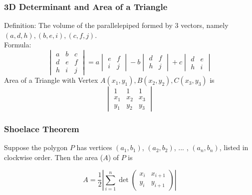 \documentclass{article}
\begin{document}
\subsubsection{3D Determinant and Area of a Triangle}
Definition:
The volume of the parallelepiped formed by 3 vectors, namely $(a,d,h), (b,e,i), (c,f,j)$.\\
Formula:
$$
\begin{vmatrix}
    a & b & c\\
    d & e & f\\
    h & i & j
\end{vmatrix}
=a
\begin{vmatrix}
   e  & f\\
   i  & j
\end{vmatrix}
-b
\begin{vmatrix}
   d  & f\\
   h  & j
\end{vmatrix}
+c
\begin{vmatrix}
   d  & e\\
   h  & i
\end{vmatrix}
$$
Area of a Triangle with Vertex $A(x_1,y_1), B(x_2,y_2), C(x_3,y_3)$ is 
$$
\begin{vmatrix}
    1 & 1 & 1\\
    x_1 & x_2 & x_3\\
    y_1 & y_2 & y_3
\end{vmatrix}
$$
\subsubsection{Shoelace Theorem}

Suppose the polygon $P$ has vertices $(a_1, b_1)$, $(a_2, b_2)$, ... , $(a_n, b_n)$, listed in clockwise order. Then the area ($A$) of $P$ is

\[A = \dfrac{1}{2} \left|\sum_{i=1}^n{\det\begin{pmatrix}x_i&x_{i+1}\\y_i&y_{i+1}\end{pmatrix}}\right|\]
\end{document}
